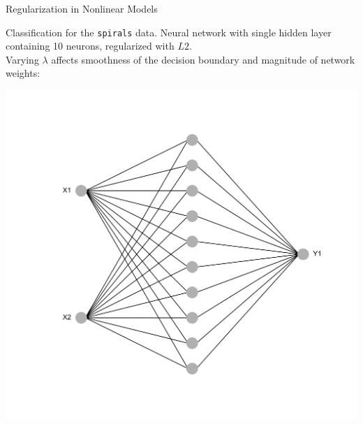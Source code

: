\documentclass[11pt,compress,t,notes=noshow, xcolor=table]{beamer}
\begin{document}
\begin{frame}{Regularization in Nonlinear Models}

\begin{center}
\begin{minipage}{0.7\textwidth}
{\small
Classification for the \texttt{spirals} data.
Neural network with single hidden layer containing 10 neurons, regularized with $L2$. \\
Varying $\lambda$ affects smoothness of the decision boundary and magnitude of network weights:}
\end{minipage}%
\begin{minipage}{0.3\textwidth}
\includegraphics[width=1\textwidth]{figure/nn_size_10.png}
\end{minipage}
\end{center}




\vfill


\end{frame}
\end{document}
